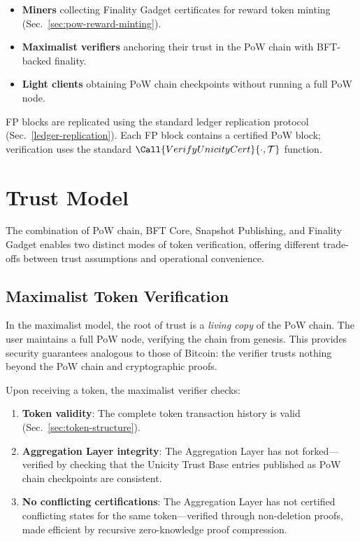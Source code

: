 \begin{itemize}[nosep]
  \item \textbf{Miners} collecting Finality Gadget certificates for reward token minting (Sec.~\ref{sec:pow-reward-minting}).
  \item \textbf{Maximalist verifiers} anchoring their trust in the PoW chain with BFT-backed finality.
  \item \textbf{Light clients} obtaining PoW chain checkpoints without running a full PoW node.
\end{itemize}

FP blocks are replicated using the standard ledger replication protocol (Sec.~\ref{ledger-replication}). Each FP block contains a certified PoW block; verification uses the standard $\Call{VerifyUnicityCert}{\cdot, \mathcal{T}}$ function.


\section{Trust Model}\label{sec:pow-trust-model}

The combination of PoW chain, BFT Core, Snapshot Publishing, and Finality Gadget enables two distinct modes of token verification, offering different trade-offs between trust assumptions and operational convenience.


\subsection{Maximalist Token Verification}\label{sec:maxi-verification}

In the maximalist model, the root of trust is a \emph{living copy} of the PoW chain. The user maintains a full PoW node, verifying the chain from genesis. This provides security guarantees analogous to those of Bitcoin: the verifier trusts nothing beyond the PoW chain and cryptographic proofs.

Upon receiving a token, the maximalist verifier checks:
\begin{enumerate}
  \item \textbf{Token validity}: The complete token transaction history is valid (Sec.~\ref{sec:token-structure}).
  \item \textbf{Aggregation Layer integrity}: The Aggregation Layer has not forked---verified by checking that the Unicity Trust Base entries published as PoW chain checkpoints are consistent.
  \item \textbf{No conflicting certifications}: The Aggregation Layer has not certified conflicting states for the same token---verified through non-deletion proofs, made efficient by recursive zero-knowledge proof compression.
\end{enumerate}

